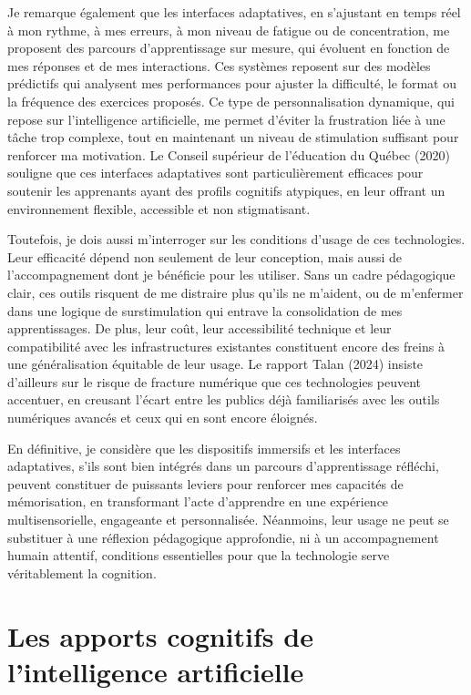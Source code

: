 \documentclass[11pt,a4paper]{report}
\begin{document}
Je remarque également que les interfaces adaptatives, en s’ajustant en temps réel à mon rythme, à mes erreurs, à mon niveau de fatigue ou de concentration, me proposent des parcours d’apprentissage sur mesure, qui évoluent en fonction de mes réponses et de mes interactions. Ces systèmes reposent sur des modèles prédictifs qui analysent mes performances pour ajuster la difficulté, le format ou la fréquence des exercices proposés. Ce type de personnalisation dynamique, qui repose sur l’intelligence artificielle, me permet d’éviter la frustration liée à une tâche trop complexe, tout en maintenant un niveau de stimulation suffisant pour renforcer ma motivation. Le Conseil supérieur de l’éducation du Québec (2020) souligne que ces interfaces adaptatives sont particulièrement efficaces pour soutenir les apprenants ayant des profils cognitifs atypiques, en leur offrant un environnement flexible, accessible et non stigmatisant.

Toutefois, je dois aussi m’interroger sur les conditions d’usage de ces technologies. Leur efficacité dépend non seulement de leur conception, mais aussi de l’accompagnement dont je bénéficie pour les utiliser. Sans un cadre pédagogique clair, ces outils risquent de me distraire plus qu’ils ne m’aident, ou de m’enfermer dans une logique de surstimulation qui entrave la consolidation de mes apprentissages. De plus, leur coût, leur accessibilité technique et leur compatibilité avec les infrastructures existantes constituent encore des freins à une généralisation équitable de leur usage. Le rapport Talan (2024) insiste d’ailleurs sur le risque de fracture numérique que ces technologies peuvent accentuer, en creusant l’écart entre les publics déjà familiarisés avec les outils numériques avancés et ceux qui en sont encore éloignés.

En définitive, je considère que les dispositifs immersifs et les interfaces adaptatives, s’ils sont bien intégrés dans un parcours d’apprentissage réfléchi, peuvent constituer de puissants leviers pour renforcer mes capacités de mémorisation, en transformant l’acte d’apprendre en une expérience multisensorielle, engageante et personnalisée. Néanmoins, leur usage ne peut se substituer à une réflexion pédagogique approfondie, ni à un accompagnement humain attentif, conditions essentielles pour que la technologie serve véritablement la cognition.

\section{Les apports cognitifs de l’intelligence artificielle}
\end{document}
